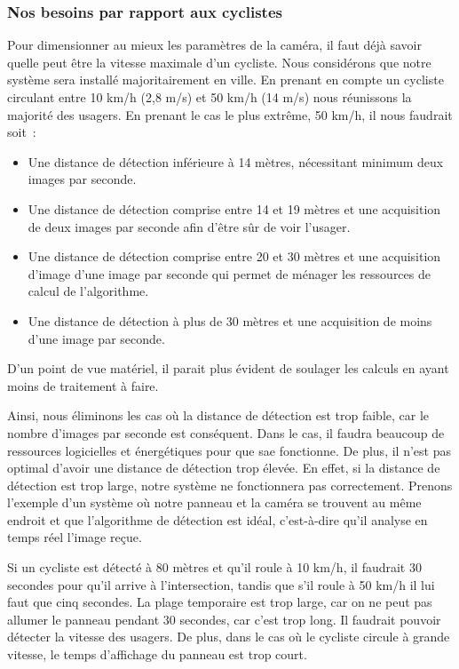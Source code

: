 \subsubsection{Nos besoins par rapport aux cyclistes}
\label{sec:camera_cycliste}

Pour dimensionner au mieux les paramètres de la caméra, il faut déjà savoir quelle peut être la vitesse maximale d’un cycliste.
Nous considérons que notre système sera installé majoritairement en ville.
En prenant en compte un cycliste circulant entre 10 km/h (2,8 m/s) et 50 km/h (14 m/s) nous réunissons la majorité des usagers.
En prenant le cas le plus extrême, 50 km/h, il nous faudrait soit :
\begin{itemize}
    \item Une distance de détection inférieure à 14 mètres, nécessitant minimum deux images par seconde.
    \item Une distance de détection comprise entre 14 et 19 mètres et une acquisition de deux images par seconde afin
          d’être sûr de voir l’usager.
    \item Une distance de détection comprise entre 20 et 30 mètres et une acquisition d’image d'une image par seconde qui permet
          de ménager les ressources de calcul de l’algorithme.
    \item Une distance de détection à plus de 30 mètres et une acquisition de moins d'une image par seconde.
\end{itemize}
D'un point de vue matériel, il parait plus évident de soulager les calculs en ayant moins de traitement à faire.

Ainsi, nous éliminons les cas où la distance de détection est trop faible, car le nombre d'images par seconde est conséquent.
Dans le cas, il faudra beaucoup de ressources logicielles et énergétiques pour que \gls{sae} fonctionne.
De plus, il n'est pas optimal d'avoir une distance de détection trop élevée.
En effet, si la distance de détection est trop large, notre système ne fonctionnera pas correctement.
Prenons l'exemple d'un système où notre panneau et la caméra se trouvent au même endroit et que l'algorithme de détection est idéal,
c'est-à-dire qu'il analyse en temps réel l'image reçue.
\begin{example}
    Si un cycliste est détecté à 80 mètres et qu'il roule à 10 km/h, il faudrait 30 secondes pour qu'il arrive à l'intersection,
    tandis que s'il roule à 50 km/h il lui faut que cinq secondes. La plage temporaire est trop large,
    car on ne peut pas allumer le panneau pendant 30 secondes, car c'est trop long. Il faudrait pouvoir détecter la vitesse des usagers.
    De plus, dans le cas où le cycliste circule à grande vitesse, le temps d'affichage du panneau est trop court.
\end{example}


